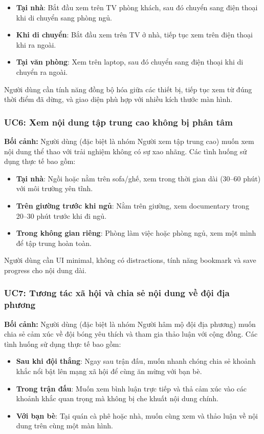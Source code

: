 \begin{itemize}
    \item \textbf{Tại nhà}: Bắt đầu xem trên TV phòng khách, sau đó chuyển sang điện thoại khi di chuyển sang phòng ngủ.
    \item \textbf{Khi di chuyển}: Bắt đầu xem trên TV ở nhà, tiếp tục xem trên điện thoại khi ra ngoài.
    \item \textbf{Tại văn phòng}: Xem trên laptop, sau đó chuyển sang điện thoại khi di chuyển ra ngoài.
\end{itemize}

Người dùng cần tính năng đồng bộ hóa giữa các thiết bị, tiếp tục xem từ đúng thời điểm đã dừng, và giao diện phù hợp với nhiều kích thước màn hình.

\subsubsection{UC6: Xem nội dung tập trung cao không bị phân tâm}

\textbf{Bối cảnh:} Người dùng (đặc biệt là nhóm Người xem tập trung cao) muốn xem nội dung thể thao với trải nghiệm không có sự xao nhãng. Các tình huống sử dụng thực tế bao gồm:

\begin{itemize}
    \item \textbf{Tại nhà}: Ngồi hoặc nằm trên sofa/ghế, xem trong thời gian dài (30--60 phút) với môi trường yên tĩnh.
    \item \textbf{Trên giường trước khi ngủ}: Nằm trên giường, xem documentary trong 20--30 phút trước khi đi ngủ.
    \item \textbf{Trong không gian riêng}: Phòng làm việc hoặc phòng ngủ, xem một mình để tập trung hoàn toàn.
\end{itemize}

Người dùng cần UI minimal, không có distractions, tính năng bookmark và save progress cho nội dung dài.

\subsubsection{UC7: Tương tác xã hội và chia sẻ nội dung về đội địa phương}

\textbf{Bối cảnh:} Người dùng (đặc biệt là nhóm Người hâm mộ đội địa phương) muốn chia sẻ cảm xúc về đội bóng yêu thích và tham gia thảo luận với cộng đồng. Các tình huống sử dụng thực tế bao gồm:

\begin{itemize}
    \item \textbf{Sau khi đội thắng}: Ngay sau trận đấu, muốn nhanh chóng chia sẻ khoảnh khắc nổi bật lên mạng xã hội để cùng ăn mừng với bạn bè.
    \item \textbf{Trong trận đấu}: Muốn xem bình luận trực tiếp và thả cảm xúc vào các khoảnh khắc quan trọng mà không bị che khuất nội dung chính.
    \item \textbf{Với bạn bè}: Tại quán cà phê hoặc nhà, muốn cùng xem và thảo luận về nội dung trên cùng một màn hình.
\end{itemize}

